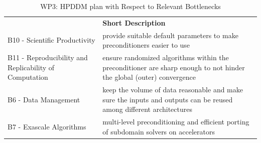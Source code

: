 \begin{table}[h!]
    \centering
    
    

    \centering
    { 
        \setlength{\parindent}{0pt}
        \def\arraystretch{1.25}
        {
            \fontsize{9}{11}\selectfont
            \begin{tabular}{!{\color{numpexgray}\vrule}p{.25\linewidth}!{\color{numpexgray}\vrule}p{.6885\linewidth}!{\color{numpexgray}\vrule}}
    
     &  {\rule{0pt}{2.5ex}\color{white}\bf Short Description }\\ 
    
    B10 - Scientific Productivity & provide suitable default parameters to make preconditioners easier to use \\
                    B11 - Reproducibility and Replicability of Computation & ensure randomized algorithms within the preconditioner are sharp enough to not hinder the global (outer) convergence \\
    B6 - Data Management & keep the volume of data reasonable and make sure the inputs and outputs can be reused among different architectures \\
    B7 - Exascale Algorithms & multi-level preconditioning and efficient porting of subdomain solvers on accelerators \\
\end{tabular}
        }
    }
    \caption{WP3: HPDDM plan with Respect to Relevant Bottlenecks}
    \label{tab:WP3:HPDDM:bottlenecks}
\end{table}
